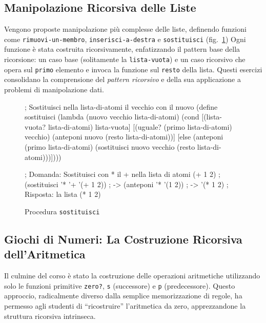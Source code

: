 \documentclass[withtimes]{easychair}
\begin{document}
\subsection{Manipolazione Ricorsiva delle Liste}\label{manipolazione-ricorsiva-delle-liste}

Vengono proposte manipolazione più complesse delle liste, definendo funzioni come \texttt{rimuovi-un-membro}, \texttt{inserisci-a-destra} e \texttt{sostituisci} (fig.~\ref{fig:sostituisci})
Ogni funzione è stata costruita ricorsivamente, enfatizzando il pattern base della ricorsione: un caso base (solitamente la \texttt{lista-vuota}) e un caso ricorsivo che opera
sul \texttt{primo} elemento e invoca la funzione sul \texttt{resto} della lista. Questi esercizi consolidano la comprensione del \emph{pattern ricorsivo} e della sua applicazione a problemi di manipolazione dati.

\begin{figure}[h]
  \centering
  \begin{pygmented}[lang=scheme]
; Sostituisci nella lista-di-atomi il vecchio con il nuovo
(define sostituisci
  (lambda (nuovo vecchio lista-di-atomi)
    (cond
     [(lista-vuota? lista-di-atomi) lista-vuota]
     [(uguale? (primo lista-di-atomi) vecchio) (anteponi nuovo (resto lista-di-atomi))]
     [else (anteponi (primo lista-di-atomi) (sostituisci nuovo vecchio (resto lista-di-atomi)))])))

; Domanda: Sostituisci con * il + nella lista di atomi (+ 1 2)
; (sostituisci '* '+ '(+ 1 2))
; -> (anteponi '* '(1 2))
; -> '(* 1 2)
; Risposta: la lista (* 1 2)
  \end{pygmented}
  \caption{Procedura \texttt{sostituisci}}
  \label{fig:sostituisci}
\end{figure}


\subsection{Giochi di Numeri: La Costruzione Ricorsiva dell'Aritmetica}\label{giochi-di-numeri-la-costruzione-ricorsiva-dellaritmetica}

Il culmine del corso è stato la costruzione delle operazioni aritmetiche utilizzando solo le funzioni primitive \texttt{zero?}, \texttt{s} (successore) e \texttt{p} (predecessore). Questo approccio, radicalmente diverso dalla semplice memorizzazione di regole, ha permesso agli studenti di ``ricostruire'' l'aritmetica da zero, apprezzandone la struttura ricorsiva intrinseca.
\end{document}
